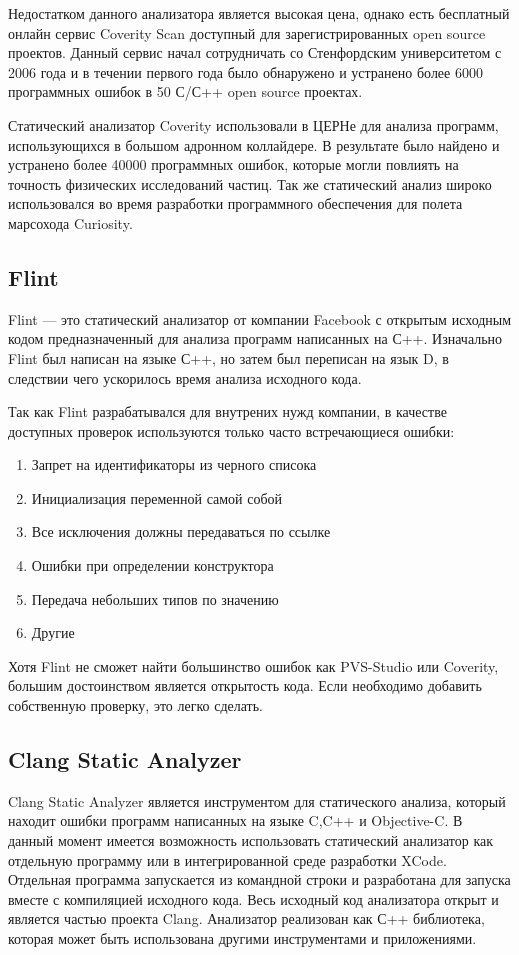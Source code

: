 Недостатком данного анализатора является высокая цена, однако есть бесплатный онлайн сервис
Coverity Scan доступный для зарегистрированных open source проектов. Данный сервис начал сотрудничать
со Стенфордским университетом с 2006 года и в течении первого года было обнаружено и устранено
более 6000 программных ошибок в 50 С/С++ open source проектах\cite{covScan}. 

Статический анализатор Coverity использовали в ЦЕРНе для анализа программ, использующихся в 
большом адронном коллайдере\cite{covCern}. В результате было найдено и устранено более 40000 программных 
ошибок, которые могли повлиять на точность физических исследований частиц. Так же статический анализ
широко использовался во время разработки программного обеспечения для полета марсохода Curiosity\cite{covCur}.   
 
\subsection{Flint}
Flint --- это статический анализатор от компании Facebook с открытым исходным кодом\cite{flintGit} предназначенный 
для анализа программ написанных на С++. Изначально Flint был написан на языке С++, но затем 
был переписан на язык D, в следствии чего ускорилось время анализа исходного кода. 

Так как Flint разрабатывался для внутрених нужд компании, в качестве доступных проверок используются 
только часто встречающиеся ошибки:
\begin{enumerate}
	\item Запрет на идентификаторы из черного списока
	\item Инициализация переменной самой собой
	\item Все исключения должны передаваться по ссылке
	\item Ошибки при определении конструктора
	\item Передача небольших типов по значению
	\item Другие\cite{flintErr}
\end{enumerate}

Хотя Flint не сможет найти большинство ошибок как PVS-Studio или Coverity, большим достоинством
является открытость кода. Если необходимо добавить собственную проверку, это легко сделать.
  
\subsection{Clang Static Analyzer}
Clang Static Analyzer является инструментом для статического анализа, который находит ошибки
программ написанных на языке C,C++ и Objective-C. В данный момент имеется возможность использовать 
статический анализатор как отдельную программу или в интегрированной среде разработки XCode.
Отдельная программа запускается из командной строки и разработана для запуска вместе с компиляцией
исходного кода. Весь исходный код анализатора открыт и является частью проекта Clang. 
Анализатор реализован как С++ библиотека, которая может быть использована другими инструментами и приложениями.
 
